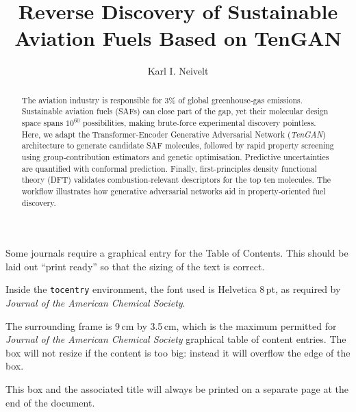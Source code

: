 \documentclass[journal=ENFL,manuscript=article]{achemso}
\author{Karl I. Neivelt}
\affiliation[University College London]{Institute of Materials Discovery, University College London, United Kingdom}
\title[GAN for SAFs]
  {Reverse Discovery of Sustainable Aviation Fuels Based on TenGAN}
\begin{document}
\begin{tocentry}

Some journals require a graphical entry for the Table of Contents.
This should be laid out ``print ready'' so that the sizing of the
text is correct.

Inside the \texttt{tocentry} environment, the font used is Helvetica
8\,pt, as required by \emph{Journal of the American Chemical
Society}.

The surrounding frame is 9\,cm by 3.5\,cm, which is the maximum
permitted for  \emph{Journal of the American Chemical Society}
graphical table of content entries. The box will not resize if the
content is too big: instead it will overflow the edge of the box.

This box and the associated title will always be printed on a
separate page at the end of the document.

\end{tocentry}

\begin{abstract}
The aviation industry is responsible for 3\% of global greenhouse‑gas emissions. Sustainable aviation fuels (SAFs) can close part of the gap, yet their molecular design space spans $10^{60}$ possibilities, making brute‑force experimental discovery pointless. Here, we adapt the Transformer-Encoder Generative Adversarial Network (\emph{TenGAN}) architecture to generate candidate SAF molecules, followed by rapid property screening using group‑contribution estimators and genetic optimisation. Predictive uncertainties are quantified with conformal prediction. Finally, first‑principles density functional theory (DFT) validates combustion‑relevant descriptors for the top ten molecules. The workflow illustrates how generative adversarial networks aid in property‑oriented fuel discovery.
\end{abstract}
\end{document}
